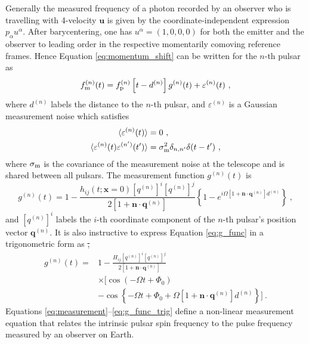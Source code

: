 \documentclass[fleqn,usenatbib,useAMS]{mnras}
\providecommand{\DIFdel}[1]{{\protect\color{red}\sout{#1}}}                      %
\providecommand{\DIFdelbegin}{} %
\providecommand{\DIFdelend}{} %
\newcommand{\DIFscaledelfig}{0.5}
\newlength{\DIFdelgraphicswidth} %
\newlength{\DIFdelgraphicsheight} %
\newcommand{\DIFdelincludegraphics}[2][]{%
\sbox{\DIFdelgraphicsbox}{\DIFOincludegraphics[#1]{#2}}%
\settoboxwidth{\DIFdelgraphicswidth}{\DIFdelgraphicsbox} %
\settoboxtotalheight{\DIFdelgraphicsheight}{\DIFdelgraphicsbox} %
\scalebox{\DIFscaledelfig}{%
\parbox[b]{\DIFdelgraphicswidth}{\usebox{\DIFdelgraphicsbox}\\[-\baselineskip] \rule{\DIFdelgraphicswidth}{0em}}\llap{\resizebox{\DIFdelgraphicswidth}{\DIFdelgraphicsheight}{%
\setlength{\unitlength}{\DIFdelgraphicswidth}%
\begin{picture}(1,1)%
\thicklines\linethickness{2pt} %
{\color[rgb]{1,0,0}\put(0,0){\framebox(1,1){}}}%
{\color[rgb]{1,0,0}\put(0,0){\line( 1,1){1}}}%
{\color[rgb]{1,0,0}\put(0,1){\line(1,-1){1}}}%
\end{picture}%
}\hspace*{3pt}}} %
} %
\DeclareRobustCommand{\DIFdelbegin}{\DIFOdelbegin \let\includegraphics\DIFdelincludegraphics} %
\DeclareRobustCommand{\DIFdelend}{\DIFOaddend \let\includegraphics\DIFOincludegraphics} %
\begin{document}
Generally the measured frequency of a photon recorded by an observer who is travelling with 4-velocity $\boldsymbol{u}$ is given by the coordinate-independent expression $p_{\alpha} u^{\alpha}$. After barycentering, one has $u^{\alpha} =(1,0,0,0)$ for both the emitter and the observer to leading order in the respective momentarily comoving reference frames. Hence Equation \eqref{eq:momentum_shift} can be written for the $n$-th pulsar as
\begin{equation}
	f_{\rm m}^{(n)}(t) = f_{\rm p}^{(n)}\left [t-d^{(n)} \right ] g^{(n)}(t) +  \varepsilon^{(n)}(t)\ ,
	\label{eq:measurement}
\end{equation}
where $d^{(n)}$ labels the distance to the $n$-th pulsar, and $\varepsilon^{(n)}$ is a Gaussian measurement noise which satisfies 
\begin{align}
	\langle \varepsilon^{(n)}(t) \rangle &= 0 \ , \\
	\langle \varepsilon^{(n)}(t) \varepsilon^{(n')}(t') \rangle &= \sigma_{\rm m}^2 \delta_{n,n'} \delta(t - t') \ ,	\label{eq:vareps}
\end{align}
where $\sigma_{\rm m}$ is the covariance of the measurement noise at the telescope and is shared between all pulsars. The measurement function $g^{(n)}(t)$ is
\begin{equation}
	g^{(n)}(t) = 1 - \frac{h_{ij} (t; \boldsymbol{x}= 0)[q^{(n)}]^i [q^{(n)}]^j}{2[1 + \boldsymbol{n}\cdot \boldsymbol{q}^{(n)}] }  \left \{1 -e^{i \Omega \left[1 + \boldsymbol{n}\cdot \boldsymbol{q}^{(n)} \right]  d^{(n)}}\right \} \ ,
	\label{eq:g_func}
\end{equation}
and $[q^{(n)}]^i$ labels the $i$-th coordinate component of the $n$-th pulsar's position vector $\boldsymbol{q}^{(n)}$. It is also instructive to express Equation \eqref{eq:g_func} in a trigonometric form as
\DIFdelbegin \DIFdel{,
}\DIFdelend \begin{align}
	g^{(n)}(t) =& 1 - \frac{ H_{ij}[q^{(n)}]^i [q^{(n)}]^j }{2 [1 + \boldsymbol{n}\cdot \boldsymbol{q}^{(n)}] } \nonumber \\
	& \times \Big[\cos\left(-\Omega t +\Phi_0\right) \nonumber \\
	&- \cos \left \{-\Omega t +\Phi_0 + \Omega \left[1 + \boldsymbol{n}\cdot \boldsymbol{q}^{(n)} \right]  d^{(n)} \right \} \Big ] \ .
	\label{eq:g_func_trig}
\end{align}
Equations \eqref{eq:measurement}--\eqref{eq:g_func_trig}  define a non-linear measurement equation that relates the intrinsic pulsar spin frequency to the pulse frequency measured by an observer on Earth. 
\end{document}
